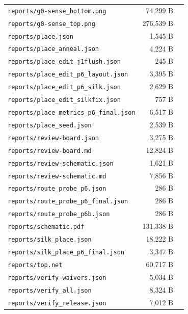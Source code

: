 \documentclass[11pt,a4paper]{article}
\begin{document}
{\begin{longtable}{p{9cm}rp{4cm}}
\texttt{reports/g0-sense\_bottom.png} & 74,299 B &  \\
\texttt{reports/g0-sense\_top.png} & 276,539 B &  \\
\texttt{reports/place.json} & 1,545 B &  \\
\texttt{reports/place\_anneal.json} & 4,224 B &  \\
\texttt{reports/place\_edit\_j1flush.json} & 245 B &  \\
\texttt{reports/place\_edit\_p6\_layout.json} & 3,395 B &  \\
\texttt{reports/place\_edit\_p6\_silk.json} & 2,629 B &  \\
\texttt{reports/place\_edit\_silkfix.json} & 757 B &  \\
\texttt{reports/place\_metrics\_p6\_final.json} & 6,517 B &  \\
\texttt{reports/place\_seed.json} & 2,539 B &  \\
\texttt{reports/review-board.json} & 3,275 B &  \\
\texttt{reports/review-board.md} & 12,824 B &  \\
\texttt{reports/review-schematic.json} & 1,621 B &  \\
\texttt{reports/review-schematic.md} & 7,856 B &  \\
\texttt{reports/route\_probe\_p6.json} & 286 B &  \\
\texttt{reports/route\_probe\_p6\_final.json} & 286 B &  \\
\texttt{reports/route\_probe\_p6b.json} & 286 B &  \\
\texttt{reports/schematic.pdf} & 131,338 B &  \\
\texttt{reports/silk\_place.json} & 18,222 B &  \\
\texttt{reports/silk\_place\_p6\_final.json} & 3,347 B &  \\
\texttt{reports/top.net} & 60,717 B &  \\
\texttt{reports/verify-waivers.json} & 5,034 B &  \\
\texttt{reports/verify\_all.json} & 8,324 B &  \\
\texttt{reports/verify\_release.json} & 7,012 B &  \\
\bottomrule
\end{longtable}
}
\end{document}
